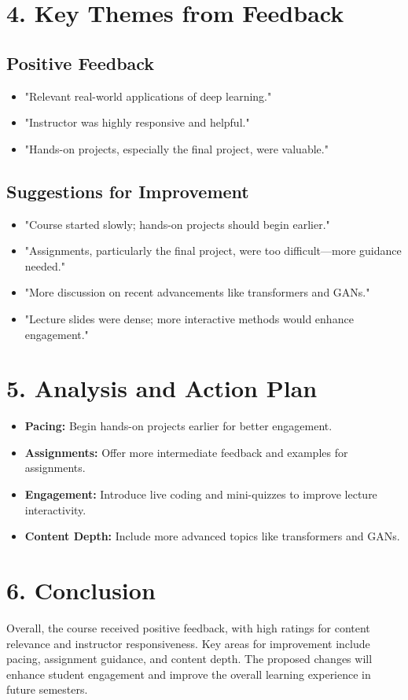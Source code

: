 \documentclass{article}
\begin{document}
\section*{4. Key Themes from Feedback}
\subsection*{Positive Feedback}
\begin{itemize}
    \item "Relevant real-world applications of deep learning."
    \item "Instructor was highly responsive and helpful."
    \item "Hands-on projects, especially the final project, were valuable."
\end{itemize}

\subsection*{Suggestions for Improvement}
\begin{itemize}
    \item "Course started slowly; hands-on projects should begin earlier."
    \item "Assignments, particularly the final project, were too difficult—more guidance needed."
    \item "More discussion on recent advancements like transformers and GANs."
    \item "Lecture slides were dense; more interactive methods would enhance engagement."
\end{itemize}

\section*{5. Analysis and Action Plan}
\begin{itemize}
    \item \textbf{Pacing:} Begin hands-on projects earlier for better engagement.
    \item \textbf{Assignments:} Offer more intermediate feedback and examples for assignments.
    \item \textbf{Engagement:} Introduce live coding and mini-quizzes to improve lecture interactivity.
    \item \textbf{Content Depth:} Include more advanced topics like transformers and GANs.
\end{itemize}

\section*{6. Conclusion}
Overall, the course received positive feedback, with high ratings for content relevance and instructor responsiveness. Key areas for improvement include pacing, assignment guidance, and content depth. The proposed changes will enhance student engagement and improve the overall learning experience in future semesters.
\end{document}
